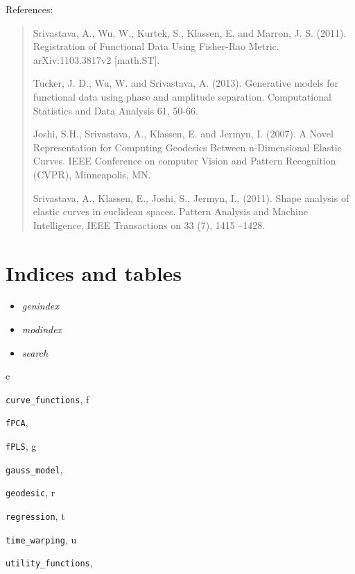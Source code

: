 \documentclass[letterpaper,10pt,english]{sphinxmanual}
\begin{document}
References:
\begin{quote}

Srivastava, A., Wu, W., Kurtek, S., Klassen, E. and Marron, J. S. (2011).
Registration of Functional Data Using Fisher-Rao Metric.
arXiv:1103.3817v2 {[}math.ST{]}.

Tucker, J. D., Wu, W. and Srivastava, A. (2013). Generative models for
functional data using phase and amplitude separation. Computational
Statistics and Data Analysis 61, 50-66.

Joshi, S.H., Srivastava, A., Klassen, E. and Jermyn, I. (2007).
A Novel Representation for Computing Geodesics Between n-Dimensional
Elastic Curves. IEEE Conference on computer Vision and Pattern Recognition
(CVPR), Minneapolis, MN.

Srivastava, A., Klassen, E., Joshi, S., Jermyn, I., (2011). Shape analysis
of elastic curves in euclidean spaces. Pattern Analysis and Machine
Intelligence, IEEE Transactions on 33 (7), 1415 –1428.
\end{quote}


\chapter{Indices and tables}
\label{index:indices-and-tables}\begin{itemize}
\item {} 
\emph{genindex}

\item {} 
\emph{modindex}

\item {} 
\emph{search}

\end{itemize}


\renewcommand{\indexname}{Python Module Index}
\begin{theindex}
\def\bigletter#1{{\Large\sffamily#1}\nopagebreak\vspace{1mm}}
\bigletter{c}
\item {\texttt{curve\_functions}}, \pageref{curve_functions:module-curve_functions}
\indexspace
\bigletter{f}
\item {\texttt{fPCA}}, \pageref{fPCA:module-fPCA}
\item {\texttt{fPLS}}, \pageref{fPLS:module-fPLS}
\indexspace
\bigletter{g}
\item {\texttt{gauss\_model}}, \pageref{gauss_model:module-gauss_model}
\item {\texttt{geodesic}}, \pageref{geodesic:module-geodesic}
\indexspace
\bigletter{r}
\item {\texttt{regression}}, \pageref{regression:module-regression}
\indexspace
\bigletter{t}
\item {\texttt{time\_warping}}, \pageref{time_warping:module-time_warping}
\indexspace
\bigletter{u}
\item {\texttt{utility\_functions}}, \pageref{utility_functions:module-utility_functions}
\end{theindex}

\renewcommand{\indexname}{Index}
\printindex
\end{document}
